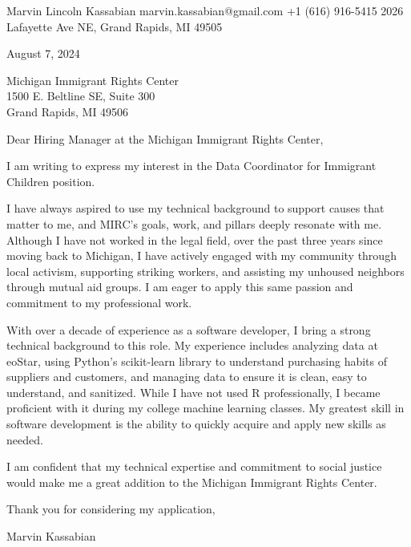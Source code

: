 \documentclass{../styles/custom}
\begin{document}
\header
{Marvin Lincoln Kassabian}
{marvin.kassabian@gmail.com}
{+1 (616) 916-5415}
{2026 Lafayette Ave NE, Grand Rapids, MI 49505}

August 7, 2024

Michigan Immigrant Rights Center\\
1500 E. Beltline SE, Suite 300\\
Grand Rapids, MI 49506

Dear Hiring Manager at the Michigan Immigrant Rights Center,\newline

I am writing to express my interest in the Data Coordinator for Immigrant Children position.\newline

I have always aspired to use my technical background to support causes that matter to me, and MIRC's goals, work, and pillars deeply resonate with me. Although I have not worked in the legal field, over the past three years since moving back to Michigan, I have actively engaged with my community through local activism, supporting striking workers, and assisting my unhoused neighbors through mutual aid groups. I am eager to apply this same passion and commitment to my professional work.\newline

With over a decade of experience as a software developer, I bring a strong technical background to this role. My experience includes analyzing data at eoStar, using Python’s scikit-learn library to understand purchasing habits of suppliers and customers, and managing data to ensure it is clean, easy to understand, and sanitized. While I have not used R professionally, I became proficient with it during my college machine learning classes. My greatest skill in software development is the ability to quickly acquire and apply new skills as needed.\newline

I am confident that my technical expertise and commitment to social justice would make me a great addition to the Michigan Immigrant Rights Center.\newline

Thank you for considering my application,

Marvin Kassabian
\end{document}
